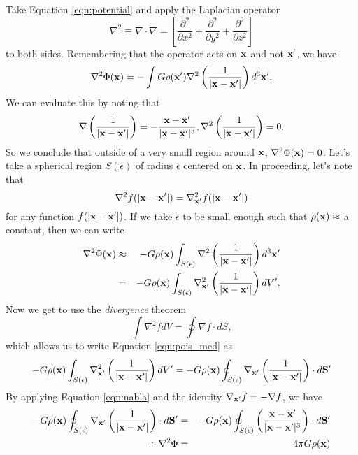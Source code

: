 \documentclass[]{article}
\begin{document}
Take Equation \ref{eqn:potential} and apply the Laplacian operator 
\begin{equation}
\nabla^{2} \equiv \nabla \cdot \nabla = \left[\frac{\partial^{2}}{\partial x^{2}}+\frac{\partial^{2}}{\partial y^{2}}+\frac{\partial^{2}}{\partial z^{2}}\right]
\end{equation}
\noindent
to both sides.  Remembering that the operator acts on $\mathbf{x}$ and not $\mathbf{x}'$, we have
\begin{equation}
\label{eqn:pois_init}
\nabla^{2} \Phi(\mathbf{x}) = - \int G \rho(\mathbf{x}') \nabla^{2} \left(\frac{1}{|\mathbf{x}-\mathbf{x}'|}\right)d^{3}\mathbf{x}'.
\end{equation}
\noindent
We can evaluate this by noting that
\begin{equation}
\label{eqn:nabla}
\nabla\left(\frac{1}{|\mathbf{x} - \mathbf{x}'|}\right) = -\frac{\mathbf{x}-\mathbf{x}'}{|\mathbf{x}-\mathbf{x}'|^3}, \nabla^{2}\left(\frac{1}{|\mathbf{x} - \mathbf{x}'|}\right) = 0.
\end{equation}
\noindent
So we conclude that outside of a very small region around $\mathbf{x}$, $\nabla^{2}\Phi(\mathbf{x})=0$.
Let's take a spherical region $S(\epsilon)$ of radius $\epsilon$ centered on $\mathbf{x}$. In proceeding, let's 
note that 
\begin{equation}
\nabla^{2} f(|\mathbf{x}-\mathbf{x}'|) = \nabla_{\mathbf{x}'}^{2} f(|\mathbf{x}-\mathbf{x}'|)
\end{equation}
\noindent
for any function $f(|\mathbf{x} - \mathbf{x}'|)$. If we take $\epsilon$ to be small enough such 
that $\rho(\mathbf{x})\approx$ a constant, then we can write
\begin{eqnarray}
\label{eqn:pois_med}
\nabla^{2}\Phi(\mathbf{x}) &\approx& - G\rho(\mathbf{x}) \int_{S(\epsilon)} \nabla^2 \left( \frac{1}{|\mathbf{x} - \mathbf{x}'|} \right)d^{3}\mathbf{x}' \nonumber \\
&=& - G \rho(\mathbf{x})  \int_{S(\epsilon)} \nabla_{\mathbf{x}'}^2 \left( \frac{1}{|\mathbf{x} - \mathbf{x}'|} \right)d V'.
\end{eqnarray}
\noindent
Now we get to use the {\it divergence} theorem
\begin{equation}
\int \nabla^{2} f dV = \oint \nabla f \cdot dS,
\end{equation}
\noindent
which allows us to write Equation \ref{eqn:pois_med} as
\begin{equation}
- G \rho(\mathbf{x})  \int_{S(\epsilon)} \nabla_{\mathbf{x}'}^2 \left( \frac{1}{|\mathbf{x} - \mathbf{x}'|} \right)d V' = - G \rho(\mathbf{x}) \oint_{S(\epsilon)} \nabla_{\mathbf{x}'}\left(\frac{1}{|\mathbf{x}-\mathbf{x}'|}\right) \cdot d\mathbf{S}'
\end{equation}
\noindent
By applying Equation \ref{eqn:nabla} and the identity $\nabla_{\mathbf{x}'} f = -\nabla f$, we have
\begin{eqnarray}
- G \rho(\mathbf{x}) \oint_{S(\epsilon)} \nabla_{\mathbf{x}'}\left(\frac{1}{|\mathbf{x}-\mathbf{x}'|}\right) \cdot d\mathbf{S}' &=&
-G \rho(\mathbf{x}) \oint_{S(\epsilon)} \left(\frac{\mathbf{x}-\mathbf{x}'}{|\mathbf{x}-\mathbf{x}'|^{3}}\right) \cdot d\mathbf{S}' \nonumber \\
\therefore \nabla^2 \Phi &=& 4 \pi G \rho(\mathbf{x})
\end{eqnarray}
\end{document}
